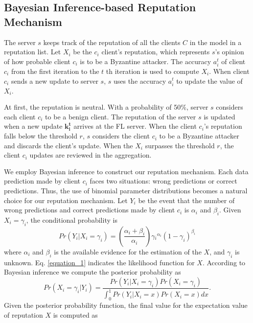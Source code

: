 \documentclass[journal]{IEEEtran}
\begin{document}
\subsection{Bayesian Inference-based Reputation Mechanism}
The server $s$ keeps track of the reputation of all the clients $C$ in the model in a reputation list. Let $X_i$ be the $c_i$ client's reputation, which represents $s$'s opinion of how probable client $c_i$ is to be a Byzantine attacker. The accuracy $a_i^t$ of client $c_i$ from the first iteration to the $t$ th iteration is used to compute $X_i$. When client $c_i$ sends a new update to server $s$, $s$ uses the accuracy $a_i^t$ to update the value of $X_i$.
\par At first, the reputation is neutral. With a probability of 50\%, server $s$ considers each client $c_i$ to be a benign client. The reputation of the server $s$ is updated when a new update $\mathbf{k_i^t}$ arrives at the FL server. When the client $c_i$'s reputation falls below the threshold $r$, $s$ considers the client $c_i$ to be a Byzantine attacker and discards the client's update. When the $X_i$ surpasses the threshold $r$, the client $c_i$ updates are reviewed in the aggregation.
\par We employ Bayesian inference to construct our reputation mechanism. Each data prediction made by client $c_i$ faces two situations: wrong predictions or correct predictions. Thus, the use of binomial parameter distributions becomes a natural choice for our reputation mechanism. Let $Y_i$ be the event that the number of wrong predictions and correct predictions made by client $c_i$ is $\alpha_i$ and $\beta_i$. Given $X_i=\gamma_i$, the conditional probability is 
\begin{equation}
  Pr(Y_i|X_i=\gamma _i)=\left ( \frac{\alpha _i+\beta _i}{\alpha _i} \right )\gamma {_{i}}^{\alpha_i}\left ( 1-\gamma_{i} \right )^{\beta_{i}}\label{equation_1}
\end{equation}
where $\alpha_i$ and $\beta_i$ is the available evidence for the estimation of the $X$, and $\gamma_i$ is unknown. Eq. \ref{equation_1} indicates the likelihood function for $X$. According to Bayesian inference we compute the posterior probability as
\begin{equation}
  Pr(X_i=\gamma _i|Y_i)=\frac{Pr\left ( Y_{i}|X_{i}=\gamma_{i} \right )Pr(X_{i}=\gamma_{i})}{\int_{0}^{1}Pr\left ( Y_{i}|X_{i}=x \right )Pr(X_{i}=x)dx}\label{equation_2}.
\end{equation}
Given the posterior probability function, the final value for the expectation value of reputation $X$ is computed as
\end{document}
